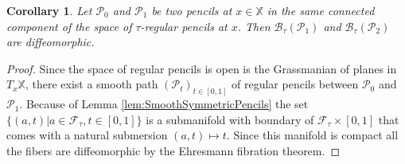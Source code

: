 \documentclass[reqno,10pt]{amsart}
\theoremstyle{plain}
\newtheorem{cor}[thm]{Corollary}
\theoremstyle{definition}
\theoremstyle{remark}
\newcommand{\type}{\tau}
\newcommand{\X}{\mathbb{X}}
\begin{document}
\begin{cor}
\label{cor:PencilsDiffeo}
Let $\mathcal{P}_0$ and $\mathcal{P}_1$ be two pencils at $x\in \X$ in the same connected component of the space of $\type$-regular pencils at $x$. Then $\mathcal{B}_\type(\mathcal{P}_1)$ and $\mathcal{B}_\type(\mathcal{P}_2)$ are diffeomorphic.
\end{cor}

\begin{proof}
Since the space of regular pencils is open is the Grassmanian of planes in $T_x\X$, there exist a smooth path $(\mathcal{P}_t)_{t\in[0,1]}$ of regular pencils between $\mathcal{P}_0$ and $\mathcal{P}_1$. Because of Lemma \ref{lem:SmoothSymmetricPencils} the set $\lbrace(a,t)|a\in \mathcal{F}_\type, t\in [0,1]\rbrace$ is a submanifold with boundary of $\mathcal{F}_\type\times [0,1]$ that comes with a natural submersion $(a,t)\mapsto t$. Since this manifold is compact all the fibers are diffeomorphic by the Ehresmann fibration theorem.
\end{proof}
\end{document}
